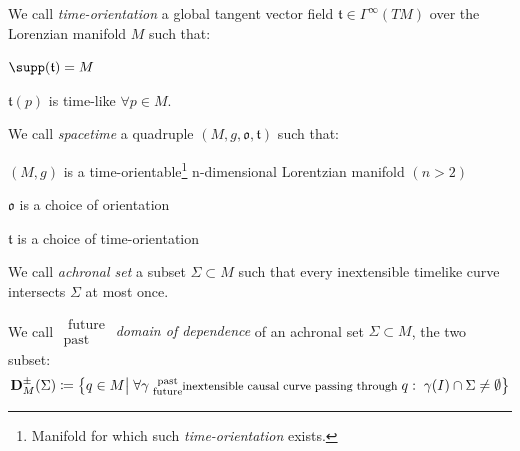 \documentclass[a4paper,10pt,smallheadings]{scrartcl}
\begin{document}
			\begin{definition}
				We call \emph{time-orientation} a global tangent vector field  $\mathfrak{t}\in \Gamma^\infty(TM)$ over the Lorenzian manifold $M$
				such that:
				\begin{compactitemize}
					\item $\supp(\mathfrak{t}) = M$
					\item $\mathfrak{t}(p)$ is time-like $\forall p \in M$.
				\end{compactitemize}
			\end{definition}

			\begin{definition}[Spacetime]
				We call \emph{spacetime} a quadruple $(M, g, \mathfrak{o}, \mathfrak{t})$ such that:
				\begin{compactitemize}
					\item $(M,g)$ is a time-orientable\footnote{Manifold for which such \emph{time-orientation} exists.} n-dimensional Lorentzian manifold $(n>2)$
					\item $\mathfrak{o}$ is a choice of orientation
					\item $\mathfrak{t}$ is a choice of time-orientation
				\end{compactitemize}
			\end{definition}				

			\begin{definition}
				We call \emph{achronal set} a subset $\Sigma \subset M$ such that every inextensible timelike curve intersects $\Sigma$ at most once.
			\end{definition}

			\begin{definition}
				We call \emph{$\substack{\textrm{ future}\\ \textrm{past } } $ domain of dependence} of an achronal set  $\Sigma \subset M$, the two subset:
				\begin{displaymath}
					\mathbf{D}_M^\pm(\Sigma) \coloneqq \big\{ q \in M \big\vert \; \forall \gamma \substack{\textrm{ past}\\ \textrm{ future} }\textrm{\footnotesize inextensible causal curve passing through }q : \; \gamma(I) \cap \Sigma \neq \emptyset  \big\}
				\end{displaymath}
			\end{definition}
			
\end{document}
